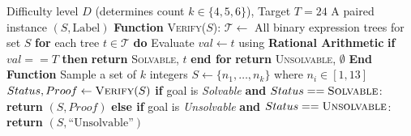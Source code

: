 \begin{algorithm}[t]
\caption{Game24 Generation and Verification}
\label{alg:game24}
\begin{algorithmic}[1]
\REQUIRE Difficulty level $D$ (determines count $k \in \{4,5,6\}$), Target $T=24$
\ENSURE A paired instance $(S, \text{Label})$
\STATE \textbf{Function} \textsc{Verify}($S$):
\STATE \quad $\mathcal{T} \leftarrow$ All binary expression trees for set $S$
\STATE \quad \textbf{for} each tree $t \in \mathcal{T}$ \textbf{do}
\STATE \quad \quad Evaluate $val \leftarrow t$ using \textbf{Rational Arithmetic}
\STATE \quad \quad \textbf{if} $val == T$ \textbf{then} \textbf{return} \textsc{Solvable}, $t$
\STATE \quad \textbf{end for}
\STATE \quad \textbf{return} \textsc{Unsolvable}, $\emptyset$
\STATE \textbf{End Function}
\REPEAT
\STATE Sample a set of $k$ integers $S \leftarrow \{n_1, \dots, n_k\}$ where $n_i \in [1, 13]$
\STATE $Status, Proof \leftarrow \textsc{Verify}(S)$
\STATE \textbf{if} goal is \textit{Solvable} \textbf{and} $Status == \textsc{Solvable}$:
\STATE \quad \textbf{return} $(S, Proof)$
\STATE \textbf{else if} goal is \textit{Unsolvable} \textbf{and} $Status == \textsc{Unsolvable}$:
\STATE \quad \textbf{return} $(S, \text{``Unsolvable''})$
\end{algorithmic}
\end{algorithm}


